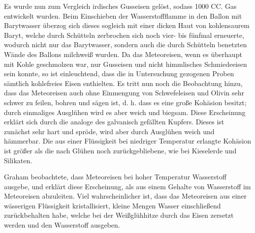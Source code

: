 \documentclass[a4paper, 11pt, oneside, german]{article}
\begin{document}
Es wurde nun zum Vergleich irdisches Gusseisen gelöst, sodass 1000 CC. Gas entwickelt wurden. Beim Einschieben der Wasserstoffflamme in den Ballon mit Barytwasser überzog sich dieses sogleich mit einer dicken Haut von kohlensaurem Baryt, welche durch Schütteln zerbrochen sich noch vier- bis fünfmal erneuerte, wodurch nicht nur das Barytwasser, sondern auch die durch Schütteln benetzten Wände des Ballons milchweiß wurden. Da das Meteoreisen, wenn es überhaupt mit Kohle geschmolzen war, nur Gusseisen und nicht himmlisches Schmiedeeisen sein konnte, so ist einleuchtend, dass die in Untersuchung gezogenen Proben sämtlich kohlefreies Eisen enthielten. Es tritt nun noch die Beobachtung hinzu, dass das Meteoreisen auch ohne Einmengung von Schwefeleisen und Olivin sehr schwer zu feilen, bohren und sägen ist, d. h. dass es eine große Kohäsion besitzt; durch einmaliges Ausglühen wird es aber weich und biegsam. Diese Erscheinung erklärt sich durch die analoge des galvanisch gefällten Kupfers. Dieses ist zunächst sehr hart und spröde, wird aber durch Ausglühen weich und hämmerbar. Die aus einer Flüssigkeit bei niedriger Temperatur erlangte Kohäsion ist größer als die nach Glühen noch zurückgebliebene, wie bei Kieselerde und Silikaten.

Graham beobachtete, dass Meteoreisen bei hoher Temperatur Wasserstoff ausgebe, und erklärt diese Erscheinung, als aus einem Gehalte von Wasserstoff im Meteoreisen abzuleiten. Viel wahrscheinlicher ist, dass das Meteoreisen aus einer wässerigen Flüssigkeit kristallisiert, kleine Mengen Wasser einschließend zurückbehalten habe, welche bei der Weißglühhitze durch das Eisen zersetzt werden und den Wasserstoff ausgeben.
\end{document}
